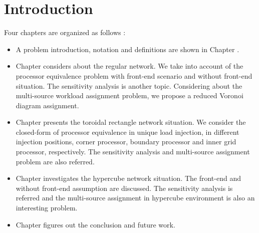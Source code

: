 \chapter{Introduction}
\label{Chap:Intro}

Four chapters are organized as follows :
\begin{itemize}
\item A problem introduction, notation and definitions are shown in Chapter \uppercase\expandafter{}. 

\item Chapter \uppercase\expandafter{} considers about the regular network.
We take into account of the processor equivalence problem with front-end scenario and without front-end situation.  The sensitivity analysis is another topic.  Considering about the multi-source workload assignment problem, we propose a reduced Voronoi diagram assignment.

\item Chapter \uppercase\expandafter{} presents the toroidal rectangle network situation.  We consider the closed-form of processor equivalence in unique load injection, in different injection positions, corner processor, boundary processor and inner grid processor, respectively.  The sensitivity analysis and multi-source assignment problem are also referred. 

\item Chapter \uppercase\expandafter{} investigates the hypercube network situation. The front-end and without front-end assumption are discussed.  The sensitivity analysis is referred and the multi-source assignment in hypercube environment is also an interesting problem.

\item Chapter \uppercase\expandafter{} figures out the conclusion and future work.
\end{itemize}

\newpage

